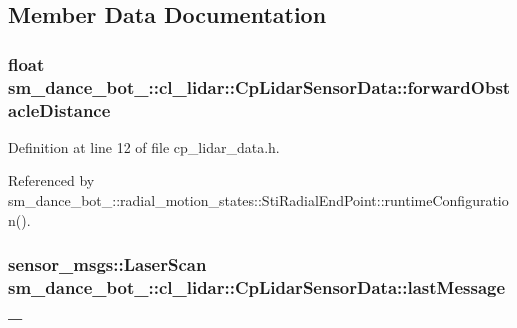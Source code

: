 \subsection{Member Data Documentation}
\subsubsection[{\texorpdfstring{forward\+Obstacle\+Distance}{forwardObstacleDistance}}]{\setlength{\rightskip}{0pt plus 5cm}float sm\+\_\+dance\+\_\+bot\+\_\+::cl\+\_\+lidar\+::\+Cp\+Lidar\+Sensor\+Data\+::forward\+Obstacle\+Distance}\hypertarget{classsm__dance__bot__2_1_1cl__lidar_1_1CpLidarSensorData_a90d3f709388392afcb30ff988c1bcb50}{}\label{classsm__dance__bot__2_1_1cl__lidar_1_1CpLidarSensorData_a90d3f709388392afcb30ff988c1bcb50}


Definition at line 12 of file cp\+\_\+lidar\+\_\+data.\+h.



Referenced by sm\+\_\+dance\+\_\+bot\+\_\+::radial\+\_\+motion\+\_\+states\+::\+Sti\+Radial\+End\+Point\+::runtime\+Configuration().

\subsubsection[{\texorpdfstring{last\+Message\+\_\+}{lastMessage_}}]{\setlength{\rightskip}{0pt plus 5cm}sensor\+\_\+msgs\+::\+Laser\+Scan sm\+\_\+dance\+\_\+bot\+\_\+::cl\+\_\+lidar\+::\+Cp\+Lidar\+Sensor\+Data\+::last\+Message\+\_\+}\hypertarget{classsm__dance__bot__2_1_1cl__lidar_1_1CpLidarSensorData_a877b88ea370b93b61a30816615e33d04}{}\label{classsm__dance__bot__2_1_1cl__lidar_1_1CpLidarSensorData_a877b88ea370b93b61a30816615e33d04}



